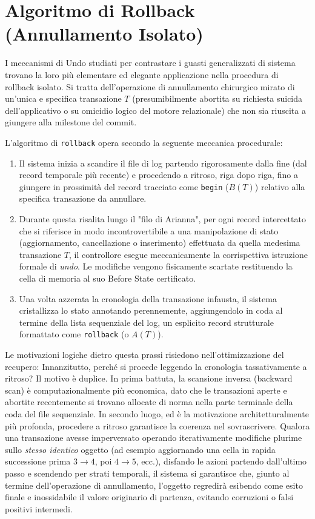 \section{Algoritmo di Rollback (Annullamento Isolato)}

I meccanismi di Undo studiati per contrastare i guasti generalizzati di sistema trovano la loro più elementare ed elegante applicazione nella procedura di rollback isolato. Si tratta dell'operazione di annullamento chirurgico mirato di un'unica e specifica transazione $T$ (presumibilmente abortita su richiesta suicida dell'applicativo o su omicidio logico del motore relazionale) che non sia riuscita a giungere alla milestone del commit.

L'algoritmo di \texttt{rollback} opera secondo la seguente meccanica procedurale:
\begin{enumerate}
    \item Il sistema inizia a scandire il file di log partendo rigorosamente dalla fine (dal record temporale più recente) e procedendo a ritroso, riga dopo riga, fino a giungere in prossimità del record tracciato come \texttt{begin} ($B(T)$) relativo alla specifica transazione da annullare.
    \item Durante questa risalita lungo il "filo di Arianna", per ogni record intercettato che si riferisce in modo incontrovertibile a una manipolazione di stato (aggiornamento, cancellazione o inserimento) effettuata da quella medesima transazione $T$, il controllore esegue meccanicamente la corrispettiva istruzione formale di \textit{undo}. Le modifiche vengono fisicamente scartate restituendo la cella di memoria al suo Before State certificato.
    \item Una volta azzerata la cronologia della transazione infausta, il sistema cristallizza lo stato annotando perennemente, aggiungendolo in coda al termine della lista sequenziale del log, un esplicito record strutturale formattato come \texttt{rollback} (o $A(T)$).
\end{enumerate}

Le motivazioni logiche dietro questa prassi risiedono nell'ottimizzazione del recupero:
Innanzitutto, perché si procede leggendo la cronologia tassativamente a ritroso? Il motivo è duplice. In prima battuta, la scansione inversa (backward scan) è computazionalmente più economica, dato che le transazioni aperte e abortite recentemente si trovano allocate di norma nella parte terminale della coda del file sequenziale. In secondo luogo, ed è la motivazione architetturalmente più profonda, procedere a ritroso garantisce la coerenza nel sovrascrivere. Qualora una transazione avesse imperversato operando iterativamente modifiche plurime sullo \textit{stesso identico} oggetto (ad esempio aggiornando una cella in rapida successione prima $3 \to 4$, poi $4 \to 5$, ecc.), disfando le azioni partendo dall'ultimo passo e scendendo per strati temporali, il sistema si garantisce che, giunto al termine dell'operazione di annullamento, l'oggetto regredirà esibendo come esito finale e inossidabile il valore originario di partenza, evitando corruzioni o falsi positivi intermedi.

